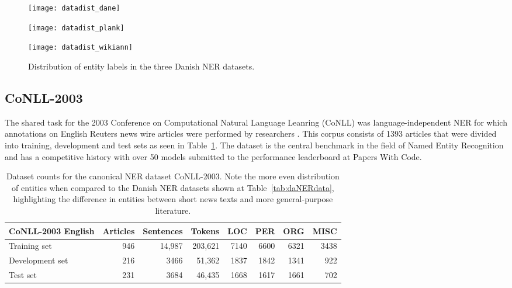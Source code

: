 \documentclass[main.tex]{subfiles}
\begin{document}
\begin{figure}[H]
    \centering
   	\begin{minipage}[t]{0.32\textwidth}
       \texttt{[image: datadist\_dane]}
    \end{minipage}\hfill
    \begin{minipage}[t]{0.32\textwidth}
        \texttt{[image: datadist\_plank]}
    \end{minipage}\hfill
    \begin{minipage}[t]{0.32\textwidth}
        \texttt{[image: datadist\_wikiann]}
    \end{minipage}
    \caption{Distribution of entity labels in the three Danish NER datasets.}
    \label{fig:dadatadist}
\end{figure}\noindent

\subsection{CoNLL-2003}
The shared task for the 2003 Conference on Computational Natural Language Leanring (CoNLL) was language-independent NER for which annotations on English Reuters news wire articles were performed by researchers \cite{tjang2003conll}.
This corpus consists of 1393 articles that were divided into training, development and test sets as seen in Table~\ref{tab:conll2003}.
The dataset is the central benchmark in the field of Named Entity Recognition \cite[Sec. 4.3]{yamada2020luke} and has a competitive history with over 50 models submitted to the performance leaderboard at Papers With Code\footnotemark.
\begin{table}[H]
    \centering
    \begin{tabular}{l|rrr|rrrr}
    CoNLL-2003 English  & Articles  & Sentences  & Tokens   & LOC   & PER   & ORG   & MISC  \\ \hline
    Training set        & 946       & 14,987     & 203,621  & 7140  & 6600  & 6321  & 3438   \\
    Development set     & 216       & 3466      & 51,362   & 1837  & 1842  & 1341  & 922    \\
    Test set            & 231       & 3684      & 46,435   & 1668  & 1617  & 1661  & 702    \\
    \end{tabular}
    \caption{
        Dataset counts for the canonical NER dataset CoNLL-2003.
        Note the more even distribution of entities when compared to the Danish NER datasets shown at Table~\ref{tab:daNERdata}, highlighting the difference in entities between short news texts and more general-purpose literature.
    }
    \label{tab:conll2003}
\end{table}
\end{document}
